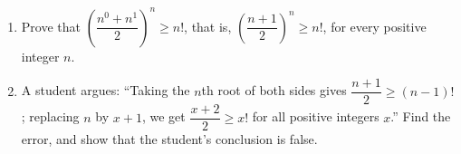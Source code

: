 \begin{enumerate}
\item[(a)] Prove that $\left(\dfrac{n^0+n^1}{2}\right)^n\ge n!$, that is, $\left(\dfrac{n+1}{2}\right)^n\ge n!$, for every positive integer $n$.
\item[(b)] A student argues: ``Taking the $n$th root of both sides gives $\dfrac{n+1}{2}\ge(n-1)!$; replacing $n$ by $x+1$, we get $\dfrac{x+2}{2}\ge x!$ for all positive integers $x$.'' Find the error, and show that the student's conclusion is false.
\end{enumerate}
